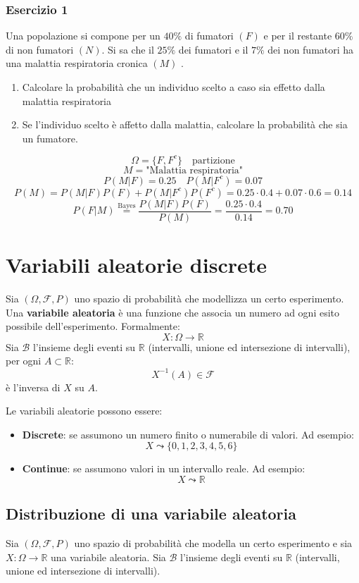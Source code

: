 \documentclass[a4paper]{article}
\theoremstyle{break}
\theoremstyle{break}
\theoremstyle{break}
\theoremstyle{break}
\begin{document}
\subsubsection{Esercizio 1}
Una popolazione si compone per un \( 40\% \)  di fumatori \((F)\) e per il restante 
\( 60\% \) di non fumatori \( (N) \). Si sa che il \( 25\% \)  dei fumatori e il 
\( 7\% \)  dei non fumatori ha una malattia respiratoria cronica \( (M) \) .
\begin{enumerate}
  \item Calcolare la probabilità che un individuo scelto a caso sia effetto dalla malattia
    respiratoria 
  \item Se l’individuo scelto è affetto dalla malattia, calcolare la probabilità che
    sia un fumatore. 
\end{enumerate}

\[
\Omega = \{F,F^c\} \quad \text{partizione}
\] 
\[
M = \text{"Malattia respiratoria"}
\] 
\[
P(M|F) = 0.25 \quad P(M|F^c) = 0.07
\] 
\[
P(M) = P(M|F)P(F) + P(M|F^c)P(F^c) = 0.25 \cdot 0.4 + 0.07 \cdot 0.6 = 0.14
\] 
\[
  P(F|M) \stackrel{\text{Bayes}}{=} \frac{P(M|F)P(F)}{P(M)} = \frac{0.25 \cdot 0.4}{0.14} = 0.70
\] 

\section{Variabili aleatorie discrete}
Sia \( (\Omega, \mathcal{F}, P) \) uno spazio di probabilità che modellizza un certo
esperimento. Una \textbf{variabile aleatoria} è una funzione che associa un numero ad
ogni esito possibile dell'esperimento. Formalmente:
\[
X: \Omega \to \mathbb{R}
\] 
Sia \( \mathcal{B} \) l'insieme degli eventi su \( \mathbb{R} \) (intervalli, unione ed 
intersezione di intervalli), per ogni \( A \subset \mathbb{R} \):
\[
  X^{-1}(A) \in \mathcal{F}
\] 
è l'inversa di \( X \) su \( A \).

\vspace{1em}
\noindent Le variabili aleatorie possono essere:
\begin{itemize}
  \item \textbf{Discrete}: se assumono un numero finito o numerabile di valori. Ad esempio:
    \[
    X \leadsto \{0,1,2,3,4,5,6\}
    \] 
  \item \textbf{Continue}: se assumono valori in un intervallo reale. Ad esempio:
    \[
    X \leadsto \mathbb{R}
    \]
\end{itemize}

\subsection{Distribuzione di una variabile aleatoria}
Sia \( (\Omega, \mathcal{F}, P) \) uno spazio di probabilità che modella un certo
esperimento e sia \( X: \Omega \to \mathbb{R} \) una variabile aleatoria.
Sia \( \mathcal{B} \) l'insieme degli eventi su \( \mathbb{R} \) (intervalli, unione ed
intersezione di intervalli). 
\end{document}
